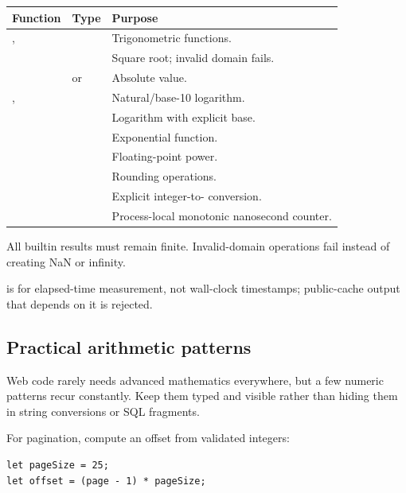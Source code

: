 \begin{center}
\begin{tabularx}{\textwidth}{@{}l l Y@{}}
\toprule
\textbf{Function} & \textbf{Type} & \textbf{Purpose} \\
\midrule
{},  &  & Trigonometric functions. \\
 &  & Square root; invalid domain fails. \\
 &  or  & Absolute value. \\
,  &  & Natural/base-10 logarithm. \\
 &  & Logarithm with explicit base. \\
 &  & Exponential function. \\
 &  & Floating-point power. \\
 &  & Rounding operations. \\
 &  & Explicit integer-to- conversion. \\
 &  & Process-local monotonic nanosecond counter. \\
\bottomrule
\end{tabularx}
\end{center}

All  builtin results must remain finite. Invalid-domain operations fail instead of creating NaN or infinity.\par
{} is for elapsed-time measurement, not wall-clock timestamps; public-cache output that depends on it is rejected.

\subsection*{Practical arithmetic patterns}

Web code rarely needs advanced mathematics everywhere, but a few numeric patterns recur constantly. Keep them typed and visible rather than hiding them in string conversions or SQL fragments.

For pagination, compute an offset from validated integers:

\begin{lstlisting}[language=Velran]
let pageSize = 25;
let offset = (page - 1) * pageSize;
\end{lstlisting}

